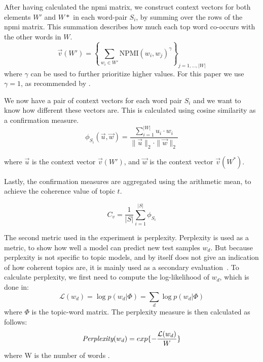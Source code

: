 After having calculated the \gls{npmi} matrix, we construct context vectors for both elements $W'$ and $W*$ in each word-pair $S_i$, by summing over the rows of the \gls{npmi} matrix.
This summation describes how much each top word co-occurs with the other words in $W$.
\begin{equation}\label{eq:coherence_1}
	\overrightarrow{v}(W') = \left\{ \sum_{w_i \in W'} \text{NPMI}(w_i, w_j)^{\gamma} \right\}_{j=1,\dots,|W|}
\end{equation}
\noindent where $\gamma$ can be used to further prioritize higher values.
For this paper we use $\gamma = 1$, as recommended by \citet{Syed2017coherence}.

We now have a pair of context vectors for each word pair $S_i$ and we want to know how different these vectors are.
This is calculated using cosine similarity as a confirmation measure.
\begin{equation}\label{eq:coherence_3}
	\phi_{S_i}(\overrightarrow{u}, \overrightarrow{w}) = \frac
	{\sum_{i = 1}^{|W|} u_i \cdot w_i}
	{\|\overrightarrow{u}\|_2 \cdot \|\overrightarrow{w}\|_2}
\end{equation}

\noindent where $\overrightarrow{u}$ is the context vector $\overrightarrow{v}(W')$, and $\overrightarrow{w}$ is the context vector $\overrightarrow{v}(W^*)$.

Lastly, the confirmation measures are aggregated using the arithmetic mean, to achieve the coherence value of topic $t$.

\begin{equation}\label{eq:coherence_4}
	C_v = \frac{1}{|S|}\sum_{i=1}^{|S|}\phi_{S_i}
\end{equation}

The second metric used in the experiment is perplexity.
Perplexity is used as a metric, to show how well a model can predict new test samples $w_d$.
But because perplexity is not specific to topic models, and by itself does not give an indication of how coherent topics are, it is mainly used as a secondary evaluation~\cite{tea_leaves}.
To calculate perplexity, we first need to compute the log-likelihood of $w_d$, which is done in:
\begin{equation}\label{eq:likelihood}
	\mathcal{L}(w_d) = \log p(w_d|\Phi) = \sum_{d} \log p(w_d|\Phi)
\end{equation}
\noindent where $\Phi$ is the topic-word matrix.
The perplexity measure is then calculated as follows:
\begin{equation}
	\emph{Perplexity}(w_d) = exp \{-\frac{\mathcal{L}(w_d)}{W}\}
\end{equation}
\noindent where W is the number of words \cite{de2008evaluating}.

